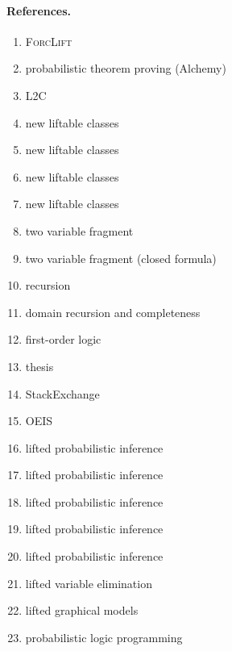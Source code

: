 \paragraph{References.}
\begin{enumerate}
  \item \textsc{ForcLift} \citep{DBLP:conf/ijcai/BroeckTMDR11}
  \item probabilistic theorem proving (Alchemy) \citep{DBLP:journals/cacm/GogateD16}
  \item L2C \citep{DBLP:conf/kr/KazemiP16}
  \item new liftable classes \citep{DBLP:conf/kr/BremenK21}
  \item new liftable classes \citep{DBLP:conf/nips/KazemiKBP16}
  \item new liftable classes \citep{DBLP:conf/lics/KuusistoL18}
  \item new liftable classes \citep{DBLP:journals/jair/Kuzelka21}
  \item two variable fragment \citep{DBLP:conf/uai/BremenK21}
  \item two variable fragment (closed formula) \citep{DBLP:journals/corr/abs-2110-05992}
  \item recursion \citep{DBLP:conf/ilp/BarvinekB0ZK21}
  \item domain recursion and completeness \citep{DBLP:conf/nips/Broeck11}
  \item first-order logic \citep{DBLP:books/daglib/0023546}
  \item thesis \citep{DBLP:phd/basesearch/VandenBroeck13}
  \item StackExchange \citep{30049}
  \item OEIS \citep{oeis}
  \item lifted probabilistic inference \citep{DBLP:conf/ijcai/BrazAR05}
  \item lifted probabilistic inference \citep{DBLP:conf/uai/BrazO17}
  \item lifted probabilistic inference \citep{DBLP:conf/aaai/KazemiP14}
  \item lifted probabilistic inference \citep{DBLP:conf/ecai/Kersting12}
  \item lifted probabilistic inference \citep{DBLP:conf/nips/JhaGMS10}
  \item lifted variable elimination \citep{DBLP:conf/aistats/TaghipourFBDB13}
  \item lifted graphical models \citep{DBLP:journals/ml/KimmigMG15}
  \item probabilistic logic programming \citep{DBLP:journals/ml/RaedtK15}

\end{enumerate}
